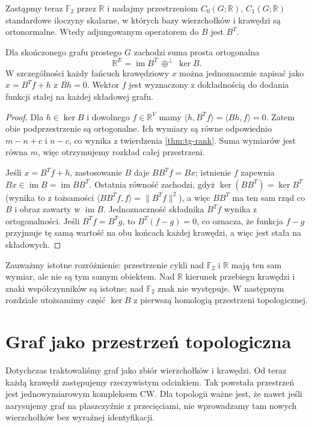 Zastąpmy teraz $\mathbb F_2$ przez $\mathbb R$ i nadajmy
przestrzeniom $C_0(G;\mathbb R)$, $C_1(G;\mathbb R)$
standardowe iloczyny skalarne, w których bazy wierzchołków
i krawędzi są ortonormalne. Wtedy adjungowanym operatorem
do $B$ jest $B^T$.

\begin{twierdzenie}
\label{thm:tg-edge-hodge}
Dla skończonego grafu prostego $G$ zachodzi suma prosta ortogonalna
\[
\mathbb R^E=\operatorname{im}B^T\ \oplus^\perp\ \ker B.
\]
W szczególności każdy łańcuch krawędziowy $x$ można
jednoznacznie zapisać jako $x=B^Tf+h$ z $Bh=0$.
Wektor $f$ jest wyznaczony z dokładnością do dodania funkcji
stałej na każdej składowej grafu.
\end{twierdzenie}

\begin{proof}
Dla $h\in\ker B$ i dowolnego $f\in\mathbb R^V$ mamy
$\langle h,B^Tf\rangle=\langle Bh,f\rangle=0$.
Zatem obie podprzestrzenie są ortogonalne.
Ich wymiary są równe odpowiednio
$m-n+c$ i $n-c$, co wynika z twierdzenia
\ref{thm:tg-rank}. Suma wymiarów jest równa $m$,
więc otrzymujemy rozkład całej przestrzeni.

Jeśli $x=B^Tf+h$, zastosowanie $B$ daje
$BB^Tf=Bx$; istnienie $f$ zapewnia
$Bx\in\operatorname{im}B=\operatorname{im}BB^T$.
Ostatnia równość zachodzi, gdyż
$\ker(BB^T)=\ker B^T$ (wynika to z tożsamości
$\langle BB^Tf,f\rangle=\|B^Tf\|^2$), a więc
$BB^T$ ma ten sam rząd co $B$ i obraz zawarty w
$\operatorname{im}B$.
Jednoznaczność składnika $B^Tf$ wynika z ortogonalności.
Jeśli $B^Tf=B^Tg$, to $B^T(f-g)=0$, co oznacza,
że funkcja $f-g$ przyjmuje tę samą wartość na obu
końcach każdej krawędzi, a więc jest stała na składowych.
\end{proof}

Zauważmy istotne rozróżnienie: przestrzenie cykli nad
$\mathbb F_2$ i $\mathbb R$ mają ten sam wymiar,
ale nie są tym samym obiektem. Nad $\mathbb R$ kierunek
przebiegu krawędzi i znaki współczynników są istotne;
nad $\mathbb F_2$ znak nie występuje. W następnym
rozdziale utożsamimy część $\ker B$ z pierwszą homologią
przestrzeni topologicznej.

\chapter{Graf jako przestrzeń topologiczna}
\label{ch:tg-topology}

Dotychczas traktowaliśmy graf jako zbiór wierzchołków i krawędzi.
Od teraz każdą krawędź zastępujemy rzeczywistym odcinkiem.
Tak powstała przestrzeń jest jednowymiarowym kompleksem CW.
Dla topologii ważne jest, że nawet jeśli narysujemy graf
na płaszczyźnie z przecięciami, nie wprowadzamy tam
nowych wierzchołków bez wyraźnej identyfikacji.

